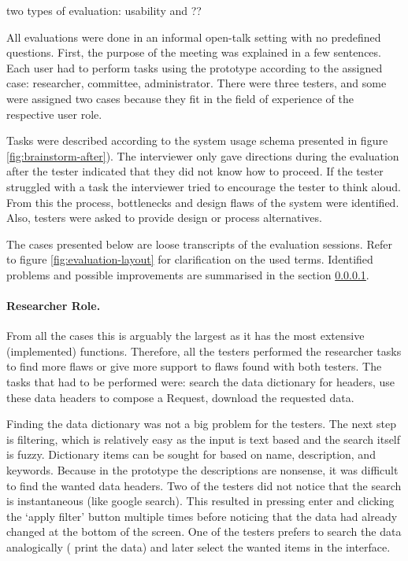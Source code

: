 two types of evaluation: usability and ??

All evaluations were done in an informal open-talk setting with no predefined questions.
First, the purpose of the meeting was explained in a few sentences.
Each user had to perform tasks using the prototype according to the assigned case: researcher, committee, administrator.
There were three testers, and some were assigned two cases because they fit in the field of experience of the respective user role.

Tasks were described according to the system usage schema presented in figure \ref{fig:brainstorm-after}).
The interviewer only gave directions during the evaluation after the tester indicated that they did not know how to proceed.
If the tester struggled with a task the interviewer tried to encourage the tester to think aloud.
From this the process, bottlenecks and design flaws of the system were identified.
Also, testers were asked to provide design or process alternatives. 


The  cases presented below are loose transcripts of the evaluation sessions.
Refer to figure \ref{fig:evaluation-layout} for clarification on the used terms.
Identified problems and possible improvements are summarised in the  section \ref{}.

\paragraph{Researcher Role.}
From all the cases this is arguably the largest as it has the most extensive (implemented) functions.
Therefore, all the testers performed the researcher tasks to find more flaws or give more support to flaws found with both testers.
The tasks that had to be performed were: search the data dictionary for headers, use these data headers to compose a Request, download the requested data. 

Finding the data dictionary was not a big problem for the testers.
The next step is filtering, which is relatively easy as the input is text based and the search itself is fuzzy.
Dictionary items can be sought for based on name, description, and keywords.
Because in the prototype the descriptions are nonsense, it was difficult to find the wanted data headers.
Two of the testers did not notice that the search is instantaneous (like google search).
This resulted in pressing enter and clicking the `apply filter' button multiple times before noticing that the data had already changed at the bottom of the screen.
One of the testers prefers to search the data analogically (\ie{} print the data) and later select the wanted items in the interface.

